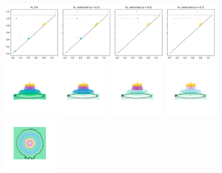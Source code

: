 \begin{figure}[htbp]\label{fig:restricted}
  \centering
  \includegraphics[trim=0 0 -10 0, clip, width=\textwidth]{scripts/figures/matching2/dgm-1.png}
  \includegraphics[trim=500 800 500 800, clip, width=0.24\textwidth]{scripts/figures/matching2/surf_side-1.png}
  \includegraphics[trim=500 800 500 800, clip, width=0.24\textwidth]{scripts/figures/matching2/surf_side-1_0.png}
  \includegraphics[trim=500 800 500 800, clip, width=0.24\textwidth]{scripts/figures/matching2/surf_side-1_1.png}
  \includegraphics[trim=500 800 500 800, clip, width=0.24\textwidth]{scripts/figures/matching2/surf_side-1_2.png}
  \includegraphics[trim=500 500 500 500, clip, width=0.24\textwidth]{scripts/figures/matching2/surf_top-1.png}

\end{figure}
